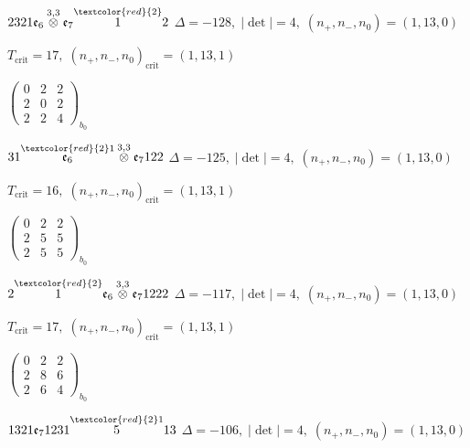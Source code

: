 \documentclass[10pt]{article}
\begin{document}
$2321\mathfrak{e}_6\overset{3,3}{\otimes}\mathfrak{e}_7\overset{\textcolor{red}{2}}{1}2$ \quad $\Delta=-128,\; |\det|=4,\; (n_+,n_-,n_0)=(1,13,0)$

\hspace{1em}$T_{\text{crit}}=17,\; (n_+,n_-,n_0)_{\text{crit}}=(1,13,1)$

\hspace{2em}$\left(\begin{smallmatrix}0 & 2 & 2 \\ 2 & 0 & 2 \\ 2 & 2 & 4\end{smallmatrix}\right)_{\!b_0}$

\smallskip

$31\overset{\textcolor{red}{2}1}{\mathfrak{e}_6}\overset{3,3}{\otimes}\mathfrak{e}_7122$ \quad $\Delta=-125,\; |\det|=4,\; (n_+,n_-,n_0)=(1,13,0)$

\hspace{1em}$T_{\text{crit}}=16,\; (n_+,n_-,n_0)_{\text{crit}}=(1,13,1)$

\hspace{2em}$\left(\begin{smallmatrix}0 & 2 & 2 \\ 2 & 5 & 5 \\ 2 & 5 & 5\end{smallmatrix}\right)_{\!b_0}$

\smallskip

$2\overset{\textcolor{red}{2}}{1}\mathfrak{e}_6\overset{3,3}{\otimes}\mathfrak{e}_71222$ \quad $\Delta=-117,\; |\det|=4,\; (n_+,n_-,n_0)=(1,13,0)$

\hspace{1em}$T_{\text{crit}}=17,\; (n_+,n_-,n_0)_{\text{crit}}=(1,13,1)$

\hspace{2em}$\left(\begin{smallmatrix}0 & 2 & 2 \\ 2 & 8 & 6 \\ 2 & 6 & 4\end{smallmatrix}\right)_{\!b_0}$

\smallskip

$1321\mathfrak{e}_71231\overset{\textcolor{red}{2}1}{5}13$ \quad $\Delta=-106,\; |\det|=4,\; (n_+,n_-,n_0)=(1,13,0)$
\end{document}
